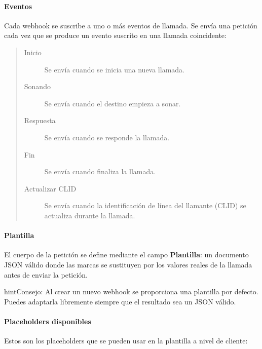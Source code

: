 \documentclass[letterpaper,10pt,spanish]{sphinxmanual}
\begin{document}
\paragraph{Eventos}
\label{administration_portal/client/vpbx/calls/webhooks:events}
Cada webhook se suscribe a uno o más eventos de llamada. Se envía una petición  cada vez que se produce un evento suscrito en una llamada coincidente:
\begin{quote}
\begin{description}
\item[{Inicio}] \leavevmode
Se envía cuando se inicia una nueva llamada.

\item[{Sonando}] \leavevmode
Se envía cuando el destino empieza a sonar.

\item[{Respuesta}] \leavevmode
Se envía cuando se responde la llamada.

\item[{Fin}] \leavevmode
Se envía cuando finaliza la llamada.

\item[{Actualizar CLID}] \leavevmode
Se envía cuando la identificación de línea del llamante (CLID) se actualiza durante la llamada.

\end{description}
\end{quote}


\paragraph{Plantilla}
\label{administration_portal/client/vpbx/calls/webhooks:template}
El cuerpo de la petición  se define mediante el campo \textbf{Plantilla}: un documento JSON válido donde las marcas  se sustituyen por los valores reales de la llamada antes de enviar la petición.

\begin{notice}{hint}{Consejo:}
Al crear un nuevo webhook se proporciona una plantilla por defecto. Puedes adaptarla libremente siempre que el resultado sea un JSON válido.
\end{notice}


\paragraph{Placeholders disponibles}
\label{administration_portal/client/vpbx/calls/webhooks:available-placeholders}
Estos son los placeholders que se pueden usar en la plantilla a nivel de cliente:
\end{document}
